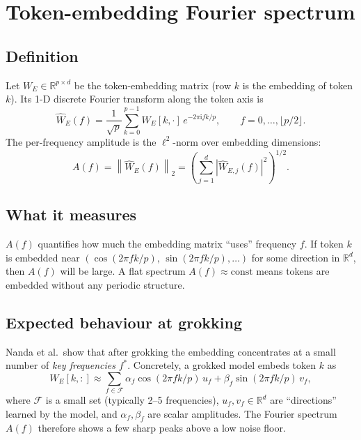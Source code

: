 \documentclass[11pt]{article}
\newcommand{\R}{\mathbb{R}}
\newcommand{\ii}{\mathrm{i}}
\begin{document}
\section{Token-embedding Fourier spectrum}
\label{sec:emb}

\subsection{Definition}

Let $W_E\in\R^{p\times d}$ be the token-embedding matrix (row $k$ is the
embedding of token $k$).
Its 1-D discrete Fourier transform along the token axis is
\begin{equation}
    \hat{W}_E(f) = \frac{1}{\sqrt{p}}\sum_{k=0}^{p-1} W_E[k,\cdot]\,
    e^{-2\pi\ii fk/p},
    \qquad f=0,\dots,\lfloor p/2\rfloor.
\end{equation}
The per-frequency amplitude is the $\ell^2$-norm over embedding dimensions:
\begin{equation}
    A(f) = \left\|\hat{W}_E(f)\right\|_2
    = \left(\sum_{j=1}^{d}|\hat{W}_{E,j}(f)|^2\right)^{1/2}.
\end{equation}

\subsection{What it measures}

$A(f)$ quantifies how much the embedding matrix ``uses'' frequency $f$.
If token $k$ is embedded near $(\cos(2\pi f k/p),\,\sin(2\pi f k/p),\dots)$
for some direction in $\R^d$, then $A(f)$ will be large.
A flat spectrum $A(f)\approx\text{const}$ means tokens are embedded without
any periodic structure.

\subsection{Expected behaviour at grokking}

Nanda et al.\ show that after grokking the embedding concentrates at a small
number of \emph{key frequencies} $f^*$.
Concretely, a grokked model embeds token $k$ as
\begin{equation}
    W_E[k,:] \approx \sum_{f\in\mathcal{F}} \alpha_f \cos(2\pi f k/p)\,u_f
    + \beta_f \sin(2\pi f k/p)\,v_f,
\end{equation}
where $\mathcal{F}$ is a small set (typically 2--5 frequencies),
$u_f,v_f\in\R^d$ are ``directions'' learned by the model, and
$\alpha_f,\beta_f$ are scalar amplitudes.
The Fourier spectrum $A(f)$ therefore shows a few sharp peaks above a low
noise floor.
\end{document}
